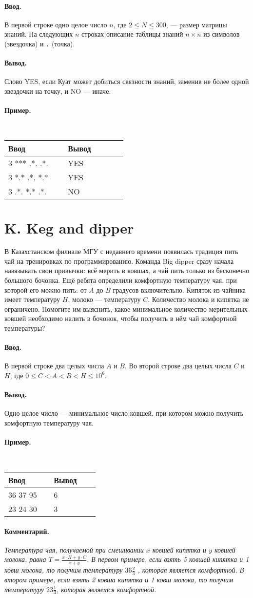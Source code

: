 \documentclass[12pt, a5paper]{article}
\newcommand{\informat}[1]
{
	\paragraph{Ввод.\\} #1
}
\newcommand{\outformat}[1]
{
	\paragraph{Вывод.\\} #1
}
\newcommand{\examplee}[4]
{
	\paragraph{Пример.\\}
	{\tt
	\begin{tabular}{|p{0.4\linewidth}|p{0.4\linewidth}|}
	\hline
	Ввод 	& Вывод  	\\
	\hline
	#1 		& #2 		\\
	\hline
	#3		& #4		\\
	\hline
	\end{tabular}
	}
}
\newcommand{\exampleee}[6]
{
	\paragraph{Пример.\\}
	{\tt
	\begin{tabular}{|p{0.4\linewidth}|p{0.4\linewidth}|}
	\hline
	Ввод 	& Вывод  	\\
	\hline
	#1 		& #2 		\\
	\hline
	#3		& #4		\\
	\hline
	#5		& #6		\\
	\hline
	\end{tabular}
	}
}
\newcommand{\excomm}[1]
{
	\paragraph{Комментарий. \\}
	\textit{#1}
}
\begin{document}
\informat{В первой строке одно целое число $n$, где $2 \le N \le 300$, --- размер матрицы знаний. \newline
На следующих $n$ строках описание таблицы знаний $n \times n$ из символов {\tt *} (звездочка) и {\tt .} (точка).}

\outformat{Слово YES, если Куат может добиться связности знаний, заменив не более одной звездочки на точку, и NO --- иначе.}

\exampleee
{3 \newline
*** \newline
.*. \newline
.*.
}{YES}
{3 \newline
*.* \newline
.*. \newline
*.*
}{YES}
{3 \newline
.*. \newline
*.* \newline
.*.
}{NO}



\section*{K. Keg and dipper}

В Казахстанском филиале МГУ с недавнего времени появилась традиция пить чай на тренировках по программированию. Команда Big dipper сразу начала навязывать свои привычки: всё мерить в ковшах, а чай пить только из бесконечно большого бочонка. Ещё ребята определили комфортную температуру чая, при которой его можно пить: от $A$ до $B$ градусов включительно. Кипяток из чайника имеет температуру $H$, молоко --- температуру $C$. Количество молока и кипятка не ограничено. Помогите им выяснить, какое минимальное количество мерительных ковшей необходимо налить в бочонок, чтобы получить в нём чай комфортной температуры?

\informat{В первой строке два целых числа $A$ и $B$. \newline
Во второй строке два целых числа $C$ и $H$, где $0 \le C < A < B < H \le 10^6$.}

\outformat{Одно целое число --- минимальное число ковшей, при котором можно получить комфортную температуру чая.}

\examplee
{36 37 \newline
25 95}{6}
{23 24 \newline
20 30
}{3}

\excomm{Температура чая, получаемой при смешивании $x$ ковшей кипятка и $y$ ковшей молока, равна $T = \frac{x \cdot H + y \cdot C}{x + y}$. \newline
В первом примере, если взять 5 ковшей кипятка и 1 ковш молока, то получим температуру $36 \frac23$ , которая является комфортной. \newline В втором примере, если взять 2 ковша кипятка и 1 ковш молока, то получим температуру $23 \frac13$, которая является комфортной.}
\end{document}
